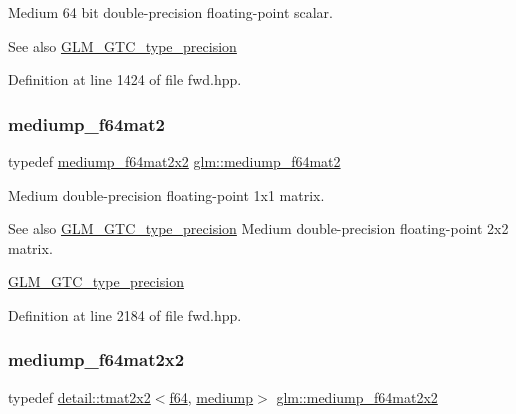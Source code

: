 Medium 64 bit double-\/precision floating-\/point scalar. \begin{DoxySeeAlso}{See also}
\hyperlink{group__gtc__type__precision}{G\+L\+M\+\_\+\+G\+T\+C\+\_\+type\+\_\+precision} 
\end{DoxySeeAlso}


Definition at line 1424 of file fwd.\+hpp.

\mbox{\label{group__gtc__type__precision_gaa7eac0340d2aaf670ec4dfbd1826fd35}} 
\subsubsection{\texorpdfstring{mediump\+\_\+f64mat2}{mediump\_f64mat2}}
{\footnotesize\ttfamily typedef \hyperlink{group__gtc__type__precision_gacfa9f872c78d9e8b8e6c5dd0088db8fc}{mediump\+\_\+f64mat2x2} \hyperlink{group__gtc__type__precision_gaa7eac0340d2aaf670ec4dfbd1826fd35}{glm\+::mediump\+\_\+f64mat2}}

Medium double-\/precision floating-\/point 1x1 matrix. \begin{DoxySeeAlso}{See also}
\hyperlink{group__gtc__type__precision}{G\+L\+M\+\_\+\+G\+T\+C\+\_\+type\+\_\+precision} Medium double-\/precision floating-\/point 2x2 matrix. 

\hyperlink{group__gtc__type__precision}{G\+L\+M\+\_\+\+G\+T\+C\+\_\+type\+\_\+precision} 
\end{DoxySeeAlso}


Definition at line 2184 of file fwd.\+hpp.

\mbox{\label{group__gtc__type__precision_gacfa9f872c78d9e8b8e6c5dd0088db8fc}} 
\subsubsection{\texorpdfstring{mediump\+\_\+f64mat2x2}{mediump\_f64mat2x2}}
{\footnotesize\ttfamily typedef \hyperlink{structglm_1_1detail_1_1tmat2x2}{detail\+::tmat2x2}$<$\hyperlink{group__gtc__type__precision_ga2bba392e555124b36cde6abba349bab3}{f64}, \hyperlink{namespaceglm_a0f04f086094c747d227af4425893f545a6416f3ea0c9025fb21ed50c4d6620482}{mediump}$>$ \hyperlink{group__gtc__type__precision_gacfa9f872c78d9e8b8e6c5dd0088db8fc}{glm\+::mediump\+\_\+f64mat2x2}}


